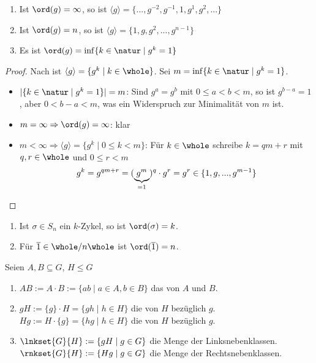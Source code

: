 \begin{proposition}
	\begin{enumerate}[label=(\alph*)]
		\item Ist $\ord(g)=\infty$, so ist $\langle g\rangle=\{...,g^{-2},g^{-1},1,g^1,g^2,...\}$
		\item Ist $\ord(g)=n$, so ist $\langle g\rangle=\{1,g,g^2,...,g^{n-1}\}$
		\item Es ist $\ord(g)=\inf\{k\in\natur\mid g^k=1\}$
	\end{enumerate}
\end{proposition}
\begin{proof}
	Nach  ist $\langle g\rangle=\{g^k\mid k\in\whole\}$. Sei $m=\inf\{k\in\natur\mid g^k=1\}$.
	\begin{itemize}
		\item $\vert\{k\in\natur\mid g^k=1\}\vert=m$: Sind $g^a=g^b$ mit $0\le a<b<m$, so ist $g^{b-a}=1$, aber $0<b-a<m$, was ein Widerspruch zur Minimalität von $m$ ist.
		\item $m=\infty\Rightarrow\ord(g)=\infty$: klar
		\item $m<\infty\Rightarrow\langle g\rangle=\{g^k\mid 0\le k<m\}$: Für $k\in\whole$ schreibe $k=qm+r$ mit $q,r\in\whole$ und $0\le r<m$
		\begin{align}
			g^k=g^{qm+r}=(\underbrace{g^m}_{=1})^q\cdot g^r=g^r\in\{1,g,...,g^{m-1}\}\notag
		\end{align}
	\end{itemize}
\end{proof}

\begin{example}
	\begin{enumerate}[label=(\alph*)]
		\item Ist $\sigma\in S_n$ ein $k$-Zykel, so ist $\ord(\sigma)=k$.
		\item Für $\overline{1}\in\whole/n\whole$ ist $\ord(\overline{1})=n$.
	\end{enumerate}
\end{example}

\begin{definition}
	Seien $A,B\subseteq G$, $H\le G$
	\begin{enumerate}[label=(\alph*)]
		\item $AB:=A\cdot B:=\{ab\mid a\in A,b\in B\}$ das  von $A$ und $B$.
		\item $gH:=\{g\}\cdot H=\{gh\mid h\in H\}$ die  von $H$ bezüglich $g$. \\
		$Hg:=H\cdot \{g\}=\{hg\mid h\in H\}$ die  von $H$ bezüglich $g$.
		\item $\lnkset{G}{H}:=\{gH\mid g\in G\}$ die Menge der Linksnebenklassen. \\
		$\rnkset{G}{H}:=\{Hg\mid g\in G\}$ die Menge der Rechtsnebenklassen.
	\end{enumerate}
\end{definition}

